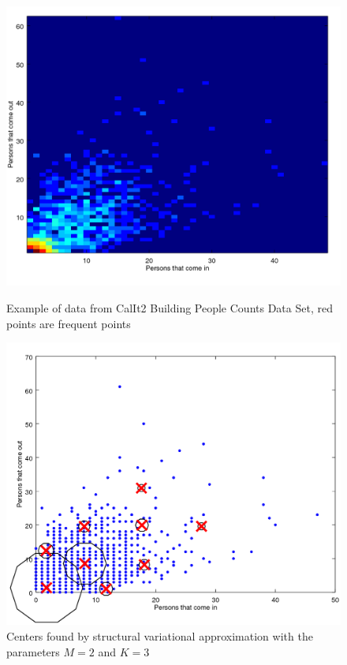 \documentclass{article}
\begin{document}
\begin{figure}[h]
	\begin{minipage}[b]{.49\linewidth}
		\vspace{10pt}
		\includegraphics[width=1.0\textwidth]{building.png}
		\begin{center}
			\caption{Example of data from CalIt2 Building People Counts Data Set, red points are frequent points}
			\label{fig7}
		\end{center}\medskip
	\end{minipage}
	\hfill
	\begin{minipage}[b]{0.49\linewidth}
		\includegraphics[width=1.0\textwidth]{expe4.png}
		\begin{center}
			\caption{Centers found by structural variational approximation with the parameters $M = 2$ and $K = 3$}
			\label{fig8}
		\end{center}\medskip
	\end{minipage}
\end{figure}
\end{document}
